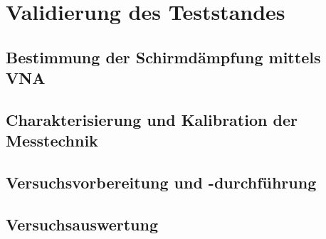 
\chapter{Validierung des Teststandes}\label{cha:4}


\section{Bestimmung der Schirmdämpfung mittels VNA}\label{cha:4_Allgemeines}




\section{Charakterisierung und Kalibration der Messtechnik}\label{cha:4_Kalibration_Messtechnik}






    
    
    
    
    
    
\section{Versuchsvorbereitung und -durchführung}\label{cha:4_Versuchsvorbereitung_und_Durchfuehrung}






\section{Versuchsauswertung}\label{cha:4_Auswertung}

